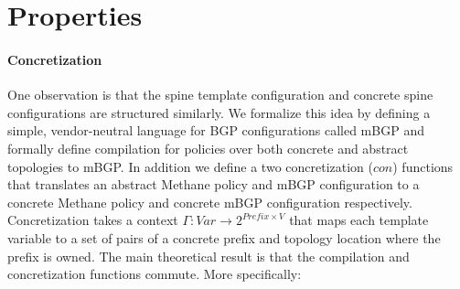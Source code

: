 \documentclass[numbers, 10pt, preprint]{sigplanconf}
\newcommand{\IE}{\emph{i.e.}}
\newcommand{\sysname}{{\small \sf Methane}\xspace}
\newcommand{\mbgp}{{\small \sf mBGP}\xspace}
\newcommand{\para}[1]{\paragraph*{\textbf{#1}}}
\begin{document}





\section{Properties}

\para{Concretization}

One observation is that the spine template configuration and concrete spine configurations are structured similarly. We formalize this idea by defining a simple, vendor-neutral language for BGP configurations called \mbgp and formally define compilation for policies over both concrete and abstract topologies to \mbgp. In addition we define a two concretization ($con$) functions that translates an abstract \sysname policy and \mbgp configuration to a concrete \sysname policy and concrete \mbgp configuration respectively. Concretization takes a context $\Gamma : \mathit{Var} \rightarrow 2^{\mathit{Prefix} \times V}$ that maps each template variable to a set of pairs of a concrete prefix and topology location where the prefix is owned. The main theoretical result is that the compilation and concretization functions commute. More specifically:


%
\end{document}

